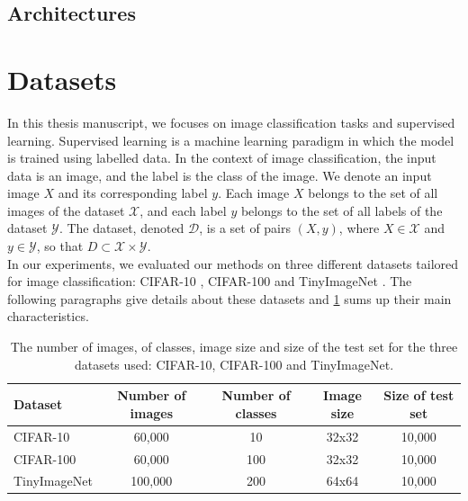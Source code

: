 \subsection{Architectures}

\section{Datasets}\label{sec:dlo:datasets}

In this thesis manuscript, we focuses on image classification tasks and
supervised learning. Supervised learning is a machine learning paradigm in which
the model is trained using labelled data. In the context of image
classification, the input data is an image, and the label is the class of the
image. We denote an input image $X$ and its corresponding label $y$. Each image
$X$ belongs to the set of all images of the dataset $\mathcal{X}$, and each
label $y$ belongs to the set of all labels of the dataset $\mathcal{Y}$. The
dataset, denoted $\mathcal{D}$, is a set of pairs $(X, y)$, where $X \in
  \mathcal{X}$ and $y \in \mathcal{Y}$, so that $D \subset \mathcal{X} \times
  \mathcal{Y}$. \\

In our experiments, we evaluated our methods on three different datasets
tailored for image classification: CIFAR-10 \cite{CIFARdataset}, CIFAR-100
\cite{CIFARdataset} and TinyImageNet \cite{TinyImageNet}. The following
paragraphs give details about these datasets and \cref{tab:dlo:datasets} sums
up their main characteristics.\\

\begin{table}[ht!]
  \centering
  \begin{tabular}{lcccc}
    \toprule
    \textbf{Dataset}    & \textbf{Number of images} & \textbf{Number of classes} &
    \textbf{Image size} & \textbf{Size of test set}                                               \\
    \hline
    CIFAR-10            & 60,000                    & 10                         & 32x32 & 10,000 \\
    CIFAR-100           & 60,000                    & 100                        & 32x32 & 10,000 \\
    TinyImageNet        & 100,000                   & 200                        & 64x64 & 10,000 \\
    \bottomrule
  \end{tabular}
  \caption{The number of images, of classes, image size and size of the test
    set for the three datasets used: CIFAR-10, CIFAR-100 and TinyImageNet.}
  \label{tab:dlo:datasets}
\end{table}

